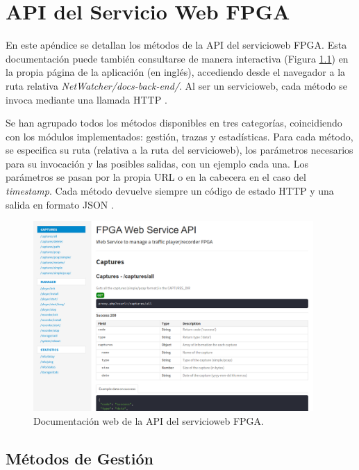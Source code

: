 \chapter{API del Servicio Web FPGA\label{extra:api_servicio_web_fpga}}

En este apéndice se detallan los métodos de la \gls{API} del \gls{servicioweb} \gls{FPGA}. Esta documentación puede también consultarse de manera interactiva (Figura \ref{fig:docsbackend}) en la propia página de la aplicación (en inglés), accediendo desde el navegador a la ruta relativa \textit{NetWatcher/docs-back-end/}. Al ser un \gls{servicioweb}, cada método se invoca mediante una llamada \gls{HTTP} \cite{httpmethods}.

Se han agrupado todos los métodos disponibles en tres categorías, coincidiendo con los módulos implementados: gestión, trazas y estadísticas. Para cada método, se especifica su ruta (relativa a la ruta del \gls{servicioweb}), los parámetros necesarios para su invocación y las posibles salidas, con un ejemplo cada una. Los parámetros se pasan por la propia \gls{URL} o en la cabecera en el caso del \textit{timestamp}. Cada método devuelve siempre un código de estado \gls{HTTP} \cite{httpcodes} y una salida en formato \gls{JSON} \cite{json}.

\begin{figure}[htp!]
  \centering
  \includegraphics[width=0.95\textwidth,clip=true]{graphics/capturas/docs_back_end}
  \caption{Documentación web de la \gls{API} del \gls{servicioweb} \gls{FPGA}.}
  \label{fig:docsbackend}
\end{figure} 

\section{Métodos de Gestión \label{extra:api:gestion}}

